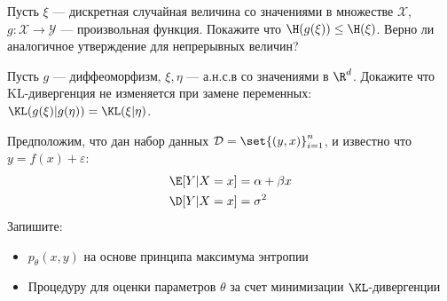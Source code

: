 \documentclass[seminar, recordsfile={../records.lua}]{practice}
\begin{document}
\begin{exercise}
	Пусть $\xi$ --- дискретная случайная величина со значениями в множестве $\mathcal{X}$, $g \colon \mathcal{X} \to \mathcal{Y}$ --- произвольная функция. Покажите что $\H(g(\xi)) \leq \H(\xi)$. Верно ли аналогичное утверждение для непрерывных величин?
\end{exercise}
\begin{exercise}
	Пусть $g$ --- диффеоморфизм, $\xi, \eta$ --- а.н.с.в со значениями в $\R^d$. Докажите что KL-дивергенция не изменяется при замене переменных: $\KL(g(\xi) | g(\eta)) = \KL(\xi | \eta)$.
\end{exercise}
\begin{exercise}
	Предположим, что дан набор данных $\mathcal{D} = \set{(y, x)}_{i = 1}^{n}$, и известно что $y = f(x) + \varepsilon$:
	\begin{align*}
		& \E[Y | X = x] = \alpha + \beta x \\
		& \D[Y | X = x] = \sigma^2 
	\end{align*}
	Запишите:
	\begin{itemize}
		\item $p_{\theta}(x, y)$ на основе принципа максимума энтропии
		\item Процедуру для оценки параметров $\theta$ за счет минимизации $\KL$-дивергенции 
	\end{itemize}
\end{exercise}
\end{document}
